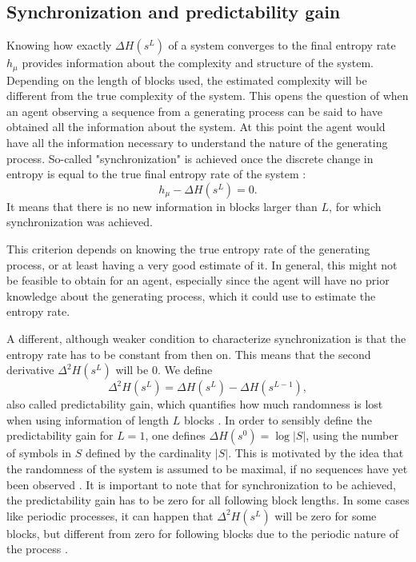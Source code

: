 \documentclass[12pt,a4paper]{article}
\begin{document}
\subsection{Synchronization and predictability gain} \label{ssec:synch_predgain}
Knowing how exactly $\Delta H(s^L)$ of a system converges to the final entropy rate $h_\mu$ provides information about the complexity and structure of the system.
Depending on the length of blocks used, the estimated complexity will be different from the true complexity of the system.
This opens the question of when an agent observing a sequence from a generating process can be said to have obtained all the information about the system.
At this point the agent would have all the information necessary to understand the nature of the generating process.
So-called "synchronization" is achieved once the discrete change in entropy is equal to the true final entropy rate of the system \autocite{crutchfield2003regularities}:
\begin{equation}
    \label{eq:synchronisation_equality}
    h_\mu - \Delta H(s^L) = 0.
\end{equation}
It means that there is no new information in blocks larger than $L$, for which synchronization was achieved.

This criterion depends on knowing the true entropy rate of the generating process, or at least having a very good estimate of it.
In general, this might not be feasible to obtain for an agent, especially since the agent will have no prior knowledge about the generating process, which it could use to estimate the entropy rate.

A different, although weaker condition to characterize synchronization is that the entropy rate has to be constant from then on.
This means that the second derivative $\Delta^2 H(s^L)$ will be 0.
We define
\begin{equation}
    \label{eq:predictability_gain}
    \Delta^2 H(s^L) = \Delta H(s^L) - \Delta H(s^{L-1}),
\end{equation}
also called predictability gain, which quantifies how much randomness is lost when using information of length $L$ blocks \autocite{crutchfield2003regularities}.
In order to sensibly define the predictability gain for $L=1$, one defines $\Delta H(s^0) = \log |S|$, using the number of symbols in $S$ defined by the cardinality $|S|$.
This is motivated by the idea that the randomness of the system is assumed to be maximal, if no sequences have yet been observed \autocite{crutchfield2003regularities}.
It is important to note that for synchronization to be achieved, the predictability gain has to be zero for all following block lengths.
In some cases like periodic processes, it can happen that $\Delta^2 H(s^L)$ will be zero for some blocks, but different from zero for following blocks due to the periodic nature of the process \autocite{crutchfield2003regularities}.
\end{document}
